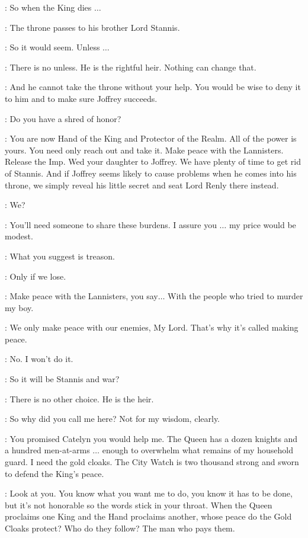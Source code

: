 \LITTLEFINGER: So when the King dies $\ldots$  

\NED: The throne passes to his brother Lord Stannis. 

\LITTLEFINGER: So it would seem. Unless $\ldots$  

\NED: There is no unless. He is the rightful heir. Nothing can change that. 

\LITTLEFINGER: And he cannot take the throne without your help. You would be wise to deny it to him and to make sure Joffrey succeeds. 

\NED: Do you have a shred of honor? 

\LITTLEFINGER: You are now Hand of the King and Protector of the Realm. All of the power is yours. You need only reach out and take it. Make peace with the Lannisters. Release the Imp. Wed your daughter to Joffrey. We have plenty of time to get rid of Stannis. And if Joffrey seems likely to cause problems when he comes into his throne, we simply reveal his little secret and seat Lord Renly there instead. 

\NED: We? 

\LITTLEFINGER: You'll need someone to share these burdens. I assure you $\ldots$ my price would be modest. 

\NED: What you suggest is treason. 

\LITTLEFINGER: Only if we lose. 

\NED: Make peace with the Lannisters, you say$\ldots$ With the people who tried to murder my boy. 

\LITTLEFINGER: We only make peace with our enemies, My Lord. That's why it's called making peace. 

\NED: No. I won't do it. 

\LITTLEFINGER: So it will be Stannis and war? 

\NED: There is no other choice. He is the heir. 

\LITTLEFINGER: So why did you call me here? Not for my wisdom, clearly. 

\NED: You promised Catelyn you would help me. The Queen has a dozen knights and a hundred men-at-arms $\ldots$ enough to overwhelm what remains of my household guard. I need the gold cloaks. The City Watch is two thousand strong and sworn to defend the King's peace. 

\LITTLEFINGER: Look at you. You know what you want me to do, you know it has to be done, but it's not honorable so the words stick in your throat. When the Queen proclaims one King and the Hand proclaims another, whose peace do the Gold Cloaks protect? Who do they follow? The man who pays them. 


